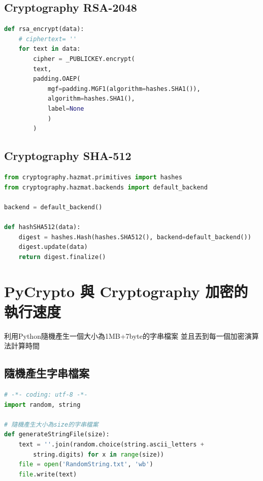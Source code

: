\documentclass[12pt,a4paper]{article}
\begin{document}
\subsection{Cryptography RSA-2048}
{
\begin{lstlisting}[language=Python]
def rsa_encrypt(data):
    # ciphertext= ''
    for text in data:
        cipher = _PUBLICKEY.encrypt(
        text,
        padding.OAEP(
            mgf=padding.MGF1(algorithm=hashes.SHA1()),
            algorithm=hashes.SHA1(),
            label=None
            )
        )
\end{lstlisting}
}

\subsection{Cryptography SHA-512}
{
\begin{lstlisting}[language=Python]
from cryptography.hazmat.primitives import hashes
from cryptography.hazmat.backends import default_backend

backend = default_backend()

def hashSHA512(data):
    digest = hashes.Hash(hashes.SHA512(), backend=default_backend())
    digest.update(data)
    return digest.finalize()
\end{lstlisting}
}

\newpage %
\section{PyCrypto 與 Cryptography 加密的執行速度}
利用Python隨機產生一個大小為1MB+7byte的字串檔案
並且丟到每一個加密演算法計算時間
\subsection{隨機產生字串檔案}
{
\begin{lstlisting}[language=Python]
# -*- coding: utf-8 -*-
import random, string

# 隨機產生大小為size的字串檔案
def generateStringFile(size):
    text = ''.join(random.choice(string.ascii_letters + 
    	string.digits) for x in range(size))
    file = open('RandomString.txt', 'wb')
    file.write(text)
\end{lstlisting}
}
\end{document}
